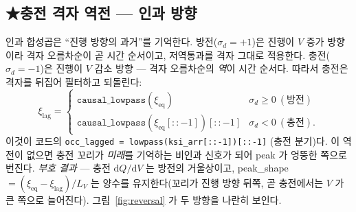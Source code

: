 \documentclass[11pt,a4paper]{article}
\newcommand{\dd}{\mathrm{d}}
\newcommand{\eq}{\mathrm{eq}}
\newcommand{\code}[1]{\texttt{#1}}
\begin{document}
\subsection{★충전 격자 역전 — 인과 방향}
인과 합성곱은 ``진행 방향의 과거''를 기억한다. 방전($\sigma_d=+1$)은 진행이 $V$ 증가 방향이라 격자 오름차순이 곧 시간
순서이고, 저역통과를 격자 그대로 적용한다. 충전($\sigma_d=-1$)은 진행이 $V$ 감소 방향 — 격자 오름차순의 \emph{역}이
시간 순서다. 따라서 충전은 격자를 뒤집어 필터하고 되돌린다:
\begin{equation}
\xi_\mathrm{lag}=
\begin{cases}
\code{causal\_lowpass}(\xi_\eq) & \sigma_d\ge0\ (\text{방전})\\[2pt]
\code{causal\_lowpass}(\xi_\eq[::-1])[::-1] & \sigma_d<0\ (\text{충전}).
\end{cases}
\label{eq:reversal}
\end{equation}
이것이 코드의 \code{occ\_lagged = lowpass(ksi\_arr[::-1])[::-1]} (충전 분기)다. 이 역전이 없으면 충전 꼬리가
\emph{미래}를 기억하는 비인과 신호가 되어 peak 가 엉뚱한 쪽으로 번진다. \emph{부호 결과} — 충전 $\dd Q/\dd V$ 는 방전의
거울상이고, peak\_shape $=(\xi_\eq-\xi_\mathrm{lag})/L_V$ 는 양수를 유지한다(꼬리가 진행 방향 뒤쪽, 곧 충전에서는
$V$ 가 큰 쪽으로 늘어진다). 그림~\ref{fig:reversal} 가 두 방향을 나란히 보인다.
\end{document}
